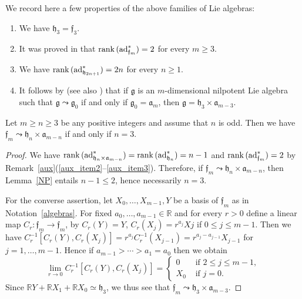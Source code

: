 \documentclass[
reqno]{amsart}
\begin{document}
\begin{remark}\label{aux}
\normalfont
We record here a few properties of the above families of Lie algebras: 
\begin{enumerate}
\item\label{aux_item1} We have ${{\mathfrak h}}_3={{\mathfrak f}}_3$. 
\item\label{aux_item2} It was proved in \cite[Prop. 5]{ACMP83} that ${{\rm rank}\,}({{\rm ad}}^*_{{{\mathfrak f}}_m})=2$ for every $m\ge 3$. 
\item\label{aux_item3} We have ${{\rm rank}\,}({{\rm ad}}^*_{{{\mathfrak h}}_{2n+1}})=2n$ for every $n\ge 1$. 
\item\label{aux_item4} It follows by \cite[Th. 5.2]{La03} (see also \cite[Th. 1(i)]{Go91}) 
that if ${{\mathfrak g}}$ is an $m$-dimensional nilpotent Lie algebra 
such that ${{\mathfrak g}}{\leadsto}{{\mathfrak g}}_0$ if and only if ${{\mathfrak g}}_0={{\mathfrak a}}_m$, then 
${{\mathfrak g}}={{\mathfrak h}}_3\times{{\mathfrak a}}_{m-3}$. 
\end{enumerate}
\end{remark}

\begin{proposition}\label{prop1}
Let $m\ge n\ge 3$ be any positive integers and assume that $n$ is odd. 
Then we have ${{\mathfrak f}}_m{\leadsto}{{\mathfrak h}}_n\times{{\mathfrak a}}_{m-n}$ if and only if $n=3$. 
\end{proposition}

\begin{proof}
We have ${{\rm rank}\,}({{\rm ad}}^*_{{{\mathfrak h}}_n\times{{\mathfrak a}}_{m-n}})={{\rm rank}\,}({{\rm ad}}^*_{{{\mathfrak h}}_n})=n-1$ and ${{\rm rank}\,}({{\rm ad}}^*_{{{\mathfrak f}}_m})=2$ 
by Remark~\ref{aux}(\eqref{aux_item2}--\eqref{aux_item3}). 
Therefore, if ${{\mathfrak f}}_m{\leadsto}{{\mathfrak h}}_n\times{{\mathfrak a}}_{m-n}$, then Lemma~\ref{NP} entails $n-1\le 2$, hence necessarily $n=3$. 

For the converse assertion, let $X_0,\dots,X_{m-1},Y$ be a basis of ${{\mathfrak f}}_m$ as in Notation~\ref{algebras}. 
For fixed $a_0,\dots,a_{m-1}\in{{\mathbb R}}$ 
and for every $r>0$ define a linear map $C_r\colon{{\mathfrak f}}_m\to{{\mathfrak f}}_m$, by $C_r(Y)=Y$, $C_r(X_j)=r^{a_j}Xj$ if $0\le j\le m-1$. 
Then we have $C_r^{-1}[C_r(Y),C_r(X_j)]=r^{a_j}C_r^{-1}(X_{j-1})=r^{a_j-a_{j-1}}X_{j-1}$ for $j=1,\dots,m-1$. 
Hence if $a_{m-1}>\cdots>a_1=a_0$ then we obtain 
$$\lim\limits_{r\to 0}C_r^{-1}[C_r(Y),C_r(X_j)]=
\begin{cases}
0 &\text{ if }2\le j\le m-1,\\
X_0 &\text{ if }j=0.
\end{cases}$$
Since ${{\mathbb R}} Y+{{\mathbb R}} X_1+{{\mathbb R}} X_0\simeq {{\mathfrak h}}_3$, we thus see that ${{\mathfrak f}}_m{\leadsto}{{\mathfrak h}}_3\times{{\mathfrak a}}_{m-3}$. 
\end{proof}
\end{document}
